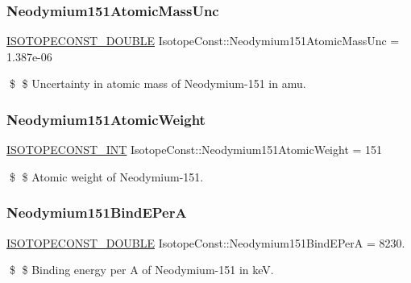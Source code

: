 \subsubsection{\texorpdfstring{Neodymium151\+Atomic\+Mass\+Unc}{Neodymium151AtomicMassUnc}}
{\footnotesize\ttfamily \mbox{\hyperlink{group___isotope_const-_macros_ga8f45a7272ce02c0b4c65c44636ed719a}{I\+S\+O\+T\+O\+P\+E\+C\+O\+N\+S\+T\+\_\+\+D\+O\+U\+B\+LE}} Isotope\+Const\+::\+Neodymium151\+Atomic\+Mass\+Unc = 1.\+387e-\/06}

\$ \$ Uncertainty in atomic mass of Neodymium-\/151 in amu. \mbox{\label{group___isotope_const-_neodymium-_nd151_gacde86e732ffdbca1e3eebf949e80c091}} 
\subsubsection{\texorpdfstring{Neodymium151\+Atomic\+Weight}{Neodymium151AtomicWeight}}
{\footnotesize\ttfamily \mbox{\hyperlink{group___isotope_const-_macros_ga5f18360b3e99483a35c32d789e62621c}{I\+S\+O\+T\+O\+P\+E\+C\+O\+N\+S\+T\+\_\+\+I\+NT}} Isotope\+Const\+::\+Neodymium151\+Atomic\+Weight = 151}

\$ \$ Atomic weight of Neodymium-\/151. \mbox{\label{group___isotope_const-_neodymium-_nd151_ga544d47094719ead1a8b3042d6da50109}} 
\subsubsection{\texorpdfstring{Neodymium151\+Bind\+E\+PerA}{Neodymium151BindEPerA}}
{\footnotesize\ttfamily \mbox{\hyperlink{group___isotope_const-_macros_ga8f45a7272ce02c0b4c65c44636ed719a}{I\+S\+O\+T\+O\+P\+E\+C\+O\+N\+S\+T\+\_\+\+D\+O\+U\+B\+LE}} Isotope\+Const\+::\+Neodymium151\+Bind\+E\+PerA = 8230.}

\$ \$ Binding energy per A of Neodymium-\/151 in keV. \mbox{\label{group___isotope_const-_neodymium-_nd151_ga0889b92ff4d70da8fa7a7fb7e75bfaff}} 
